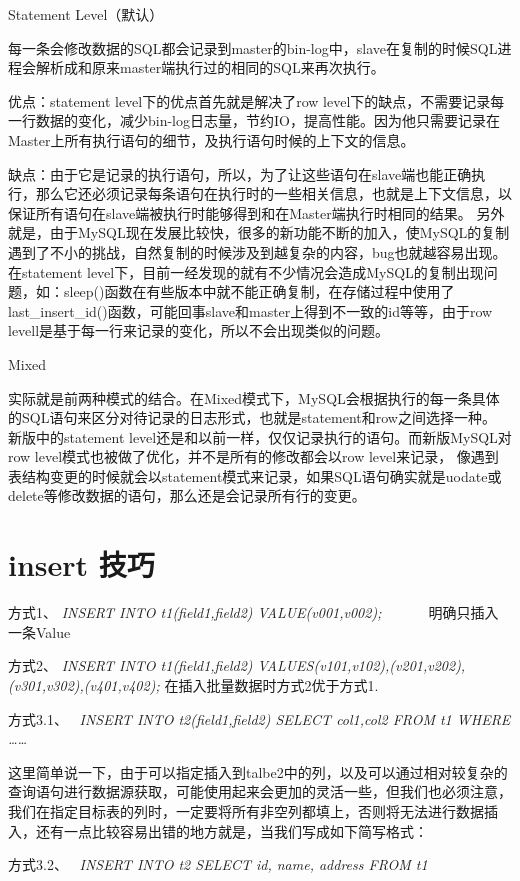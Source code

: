 Statement Level（默认）

每一条会修改数据的SQL都会记录到master的bin-log中，slave在复制的时候SQL进程会解析成和原来master端执行过的相同的SQL来再次执行。

优点：statement level下的优点首先就是解决了row level下的缺点，不需要记录每一行数据的变化，减少bin-log日志量，节约IO，提高性能。因为他只需要记录在Master上所有执行语句的细节，及执行语句时候的上下文的信息。

缺点：由于它是记录的执行语句，所以，为了让这些语句在slave端也能正确执行，那么它还必须记录每条语句在执行时的一些相关信息，也就是上下文信息，以保证所有语句在slave端被执行时能够得到和在Master端执行时相同的结果。
另外就是，由于MySQL现在发展比较快，很多的新功能不断的加入，使MySQL的复制遇到了不小的挑战，自然复制的时候涉及到越复杂的内容，bug也就越容易出现。
在statement level下，目前一经发现的就有不少情况会造成MySQL的复制出现问题，如：sleep()函数在有些版本中就不能正确复制，在存储过程中使用了last_insert_id()函数，可能回事slave和master上得到不一致的id等等，由于row levell是基于每一行来记录的变化，所以不会出现类似的问题。

Mixed

实际就是前两种模式的结合。在Mixed模式下，MySQL会根据执行的每一条具体的SQL语句来区分对待记录的日志形式，也就是statement和row之间选择一种。
新版中的statement level还是和以前一样，仅仅记录执行的语句。而新版MySQL对row level模式也被做了优化，并不是所有的修改都会以row level来记录，
像遇到表结构变更的时候就会以statement模式来记录，如果SQL语句确实就是uodate或delete等修改数据的语句，那么还是会记录所有行的变更。

\section{insert 技巧}
方式1、 \textit{INSERT INTO t1(field1,field2) VALUE(v001,v002);   }    明确只插入一条Value

方式2、\textit{ INSERT INTO t1(field1,field2) VALUES(v101,v102),(v201,v202),(v301,v302),(v401,v402);}
在插入批量数据时方式2优于方式1.

方式3.1、  \textit{INSERT INTO t2(field1,field2) SELECT col1,col2 FROM t1 WHERE ……}

这里简单说一下，由于可以指定插入到talbe2中的列，以及可以通过相对较复杂的查询语句进行数据源获取，可能使用起来会更加的灵活一些，但我们也必须注意，我们在指定目标表的列时，一定要将所有非空列都填上，否则将无法进行数据插入，还有一点比较容易出错的地方就是，当我们写成如下简写格式：

方式3.2、  \textit{INSERT INTO t2 SELECT id, name, address FROM t1}

